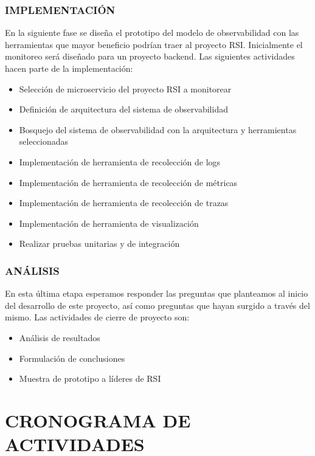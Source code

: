 \documentclass[a4paper,12pt]{article}
\begin{document}
\subsubsection{\normalsize IMPLEMENTACIÓN}
En la siguiente fase se diseña el prototipo del modelo de observabilidad con las herramientas que mayor beneficio podrían traer al proyecto RSI. Inicialmente el monitoreo será diseñado para un proyecto backend.  Las siguientes actividades hacen parte de la implementación:
\begin{itemize}
    \item Selección de microservicio del proyecto RSI a monitorear 
    \item Definición de arquitectura del sistema de observabilidad
    \item Bosquejo del sistema de observabilidad con la arquitectura y herramientas seleccionadas
    \item Implementación de herramienta de recolección de logs
    \item Implementación de herramienta de recolección de métricas
    \item Implementación de herramienta de recolección de trazas
    \item Implementación de herramienta de visualización
    \item Realizar pruebas unitarias y de integración
\end{itemize}

\subsubsection{\normalsize ANÁLISIS}
En esta última etapa esperamos responder las preguntas que planteamos al inicio del desarrollo de este proyecto, así como preguntas que hayan surgido a través del mismo. Las actividades de cierre de proyecto son:
\begin{itemize}
    \item Análisis de resultados 
    \item Formulación de conclusiones
    \item Muestra de prototipo a líderes de RSI
\end{itemize}


\section{\large CRONOGRAMA DE ACTIVIDADES}
\end{document}
